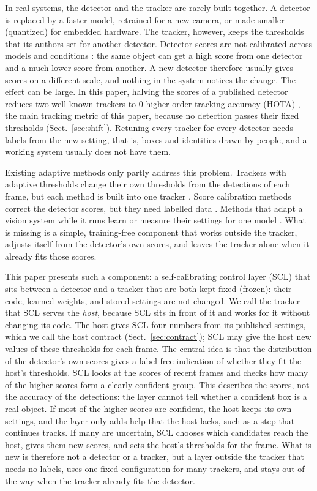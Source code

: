 \documentclass[pdflatex,sn-mathphys-num,iicol]{sn-jnl}
\newcommand{\scl}{SCL}
\begin{document}
In real systems, the detector and the tracker are rarely built together. A detector is replaced by
a faster model, retrained for a new camera, or made smaller (quantized) for embedded hardware. The
tracker, however, keeps the thresholds that its authors set for another detector. Detector scores
are not calibrated across models and conditions \cite{kuppers2020detcalib}: the same object can get
a high score from one detector and a much lower score from another. A new detector therefore
usually gives scores on a different scale, and nothing in the system notices the change. The effect
can be large. In this paper, halving the scores of a published detector reduces two well-known
trackers to 0 higher order tracking accuracy (HOTA) \cite{luiten2021hota}, the main tracking metric
of this paper, because no detection passes their fixed thresholds (Sect.~\ref{sec:shift}).
Retuning every tracker for every detector needs labels from the new setting, that is, boxes and
identities drawn by people, and a working system usually does not have them.

Existing adaptive methods only partly address this problem. Trackers with adaptive thresholds
change their own thresholds from the detections of each frame, but each method is built into one
tracker \cite{ma2023adaptivebytetrack,shim2024adaptrack,act2026adaptive}. Score calibration methods
correct the detector scores, but they need labelled data \cite{kuppers2020detcalib}. Methods that
adapt a vision system while it runs learn or measure their settings for one model
\cite{han2022dynamic,jiang2018chameleon}. What is missing is a simple, training-free component that
works outside the tracker, adjusts itself from the detector's own scores, and leaves the tracker
alone when it already fits those scores.

This paper presents such a component: a self-calibrating control layer (\scl{}) that sits between
a detector and a tracker that are both kept fixed (frozen): their code, learned weights, and stored
settings are not changed. We call the tracker that \scl{} serves the \emph{host}, because \scl{}
sits in front of it and works for it without changing its code. The host gives \scl{} four numbers
from its published settings, which we call the host contract (Sect.~\ref{sec:contract}); \scl{}
may give the host new values of these thresholds for each frame. The central idea is that the
distribution of the detector's own scores gives a label-free indication of whether they fit the
host's thresholds. \scl{} looks at the scores of recent frames and checks how many of the higher
scores form a clearly confident group. This describes the scores, not the accuracy of the
detections: the layer cannot tell whether a confident box is a real object. If most of the higher
scores are confident, the host keeps its own settings, and the layer only adds help that the host
lacks, such as a step that continues tracks. If many are uncertain, \scl{} chooses which candidates
reach the host, gives them new scores, and sets the host's thresholds for the frame. What is new is therefore not
a detector or a tracker, but a layer outside the tracker that needs no labels, uses one fixed
configuration for many trackers, and stays out of the way when the tracker already fits the
detector.
\end{document}
